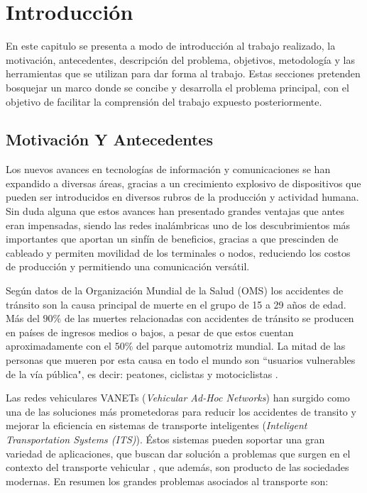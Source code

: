 \chapter{Introducción}
    En este capitulo se presenta a modo de introducción al trabajo realizado, la motivación, antecedentes, descripción del problema, objetivos, metodología y las herramientas que se utilizan para dar forma al trabajo. Estas secciones pretenden bosquejar un marco donde se concibe y desarrolla el problema principal, con el objetivo de facilitar la comprensión del trabajo expuesto posteriormente.
    
\section{Motivación Y Antecedentes}

Los nuevos avances en tecnologías de información y comunicaciones se han expandido a diversas áreas, gracias a un crecimiento explosivo de dispositivos que pueden ser introducidos en diversos rubros de la producción y actividad humana.  Sin duda alguna que estos avances han presentado grandes ventajas que antes eran impensadas, siendo las redes inalámbricas uno de los descubrimientos más importantes que aportan un sinfín de beneficios, gracias a que prescinden de cableado y permiten movilidad de los terminales o nodos, reduciendo los costos de producción y permitiendo una comunicación versátil. 

Según datos de la Organización Mundial de la Salud (OMS) los accidentes de tránsito son la causa principal de muerte en el grupo de 15 a 29 años de edad. Más del $90\%$ de las muertes relacionadas con accidentes de tránsito se producen en países de ingresos medios o bajos, a pesar de que estos cuentan aproximadamente con el $50\%$ del parque automotriz mundial. La mitad de las personas que mueren por esta causa en todo el mundo son ``usuarios vulnerables de la vía pública", es decir: peatones, ciclistas y motociclistas \cite{GSRRS}.

Las redes vehiculares VANETs (\textit{Vehicular Ad-Hoc Networks}) han surgido como una de las soluciones más prometedoras para reducir los accidentes de transito y mejorar la eficiencia en sistemas de transporte inteligentes (\textit{Inteligent Transportation Systems (ITS)}). Éstos sistemas pueden soportar una gran variedad de aplicaciones, que buscan dar solución a problemas que surgen en el contexto del transporte vehicular \cite{Bi2017}, que además, son producto de las sociedades modernas. En resumen los grandes problemas asociados al transporte son: 

